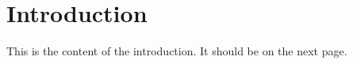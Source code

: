 \documentclass[12pt,a4paper,oneside]{report}
\begin{document}
\chapter{Introduction}
This is the content of the introduction. It should be on the next page.
\end{document}
